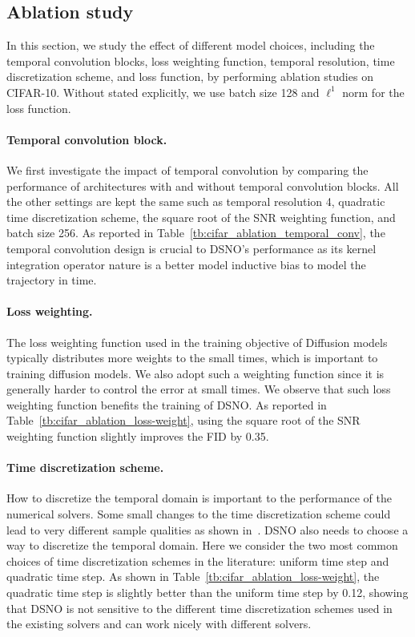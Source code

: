 \subsection{Ablation study}
In this section, we study the effect of different model choices, including the temporal convolution blocks, loss weighting function, temporal resolution, time discretization scheme, and loss function, by performing ablation studies on CIFAR-10. Without stated explicitly, we use batch size 128 and $\ell^1$ norm for the loss function. 
\vspace{-0.1in}
\paragraph{Temporal convolution block.} We first investigate the impact of temporal convolution by comparing the performance of architectures with and without temporal convolution blocks. All the other settings are kept the same such as temporal resolution 4, quadratic time discretization scheme, the square root of the SNR weighting function, and batch size 256. As reported in Table~\ref{tb:cifar_ablation_temporal_conv}, the temporal convolution design is crucial to DSNO's performance as its kernel integration operator nature is a better model inductive bias to model the trajectory in time. 



\vspace{-0.1in}
\paragraph{Loss weighting.}  The loss weighting function used in the training objective of Diffusion models\cite{ho2020denoising, song2020score} typically distributes more weights to the small times, which is important to training diffusion models. We also adopt such a weighting function since it is generally harder to control the error at small times. We observe that such loss weighting function benefits the training of DSNO. As reported in Table~\ref{tb:cifar_ablation_loss-weight}, using the square root of the SNR weighting function slightly improves the FID by 0.35. 
\vspace{-0.1in}
\paragraph{Time discretization scheme.} How to discretize the temporal domain is important to the performance of the numerical solvers. Some small changes to the time discretization scheme could lead to very different sample qualities as shown in~\cite{karras2022elucidating,zhang2022fast}. DSNO also needs to choose a way to discretize the temporal domain. Here we consider the two most common choices of time discretization schemes in the literature: uniform time step and quadratic time step. As shown in Table~\ref{tb:cifar_ablation_loss-weight}, the quadratic time step is slightly better than the uniform time step by 0.12, showing that DSNO is not sensitive to the different time discretization schemes used in the existing solvers and can work nicely with different solvers. 
\vspace{-0.1in}
